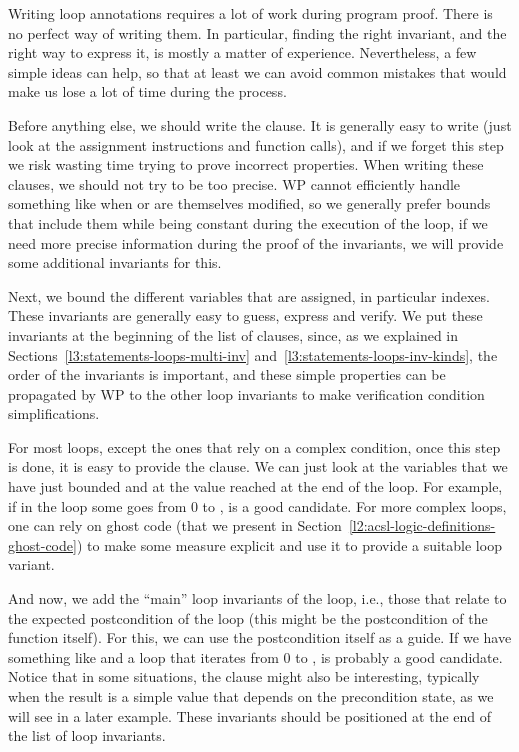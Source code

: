 

Writing loop annotations requires a lot of work during program proof. There is
no perfect way of writing them. In particular, finding the right invariant, and
the right way to express it, is mostly a matter of experience. Nevertheless, a
few simple ideas can help, so that at least we can avoid common mistakes that
would make us lose a lot of time during the process.


Before anything else, we should write the  clause. It is
generally easy to write (just look at the assignment instructions and function
calls), and if we forget this step we risk wasting time trying to prove incorrect
properties. When writing these clauses, we should not try to be too precise. WP cannot
efficiently handle something like  when  or
 are themselves modified, so we generally prefer bounds that
include them while being constant during the execution of the loop, if we need
more precise information during the proof of the invariants, we will provide
some additional invariants for this.


Next, we bound the different variables that are assigned, in particular indexes.
These invariants are generally easy to guess, express and verify. We put these
invariants at the beginning of the list of  clauses,
since, as we explained in Sections~\ref{l3:statements-loops-multi-inv}
and~\ref{l3:statements-loops-inv-kinds}, the order of the invariants is important,
and these simple properties can be propagated by WP to the other loop invariants
to make verification condition simplifications.


For most loops, except the ones that rely on a complex condition, once this step
is done, it is easy to provide the  clause. We can just
look at the variables that we have just bounded and at the value reached
at the end of the loop. For example, if in the loop some 
goes from 0 to ,  is a good candidate. For more
complex loops, one can rely on ghost code (that we present in
Section~\ref{l2:acsl-logic-definitions-ghost-code}) to make some measure
explicit and use it to provide a suitable loop variant.


And now, we add the ``main'' loop invariants of the loop, i.e., those that relate to
the expected postcondition of the loop (this might be the postcondition of the
function itself). For this, we can use the postcondition itself as a guide. If
we have something like  and a loop that iterates
 from 0 to ,  is
probably a good candidate. Notice that in some situations, the
 clause might also be interesting, typically when the result
is a simple value that depends on the precondition state, as we will see in a
later example. These invariants should be positioned at the end of the list of
loop invariants.


